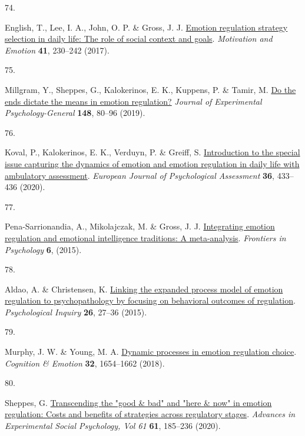\documentclass[
  man,floatsintext]{apa6}
\newlength{\cslhangindent}
\newlength{\csllabelwidth}
\newlength{\cslentryspacingunit} %
\newenvironment{CSLReferences}[2] %
 {%
  \setlength{\parindent}{0pt}
  \ifodd #1
  \let\oldpar\par
  \def\par{\hangindent=\cslhangindent\oldpar}
  \fi
  \setlength{\parskip}{#2\cslentryspacingunit}
 }%
 {}
\newcommand{\CSLLeftMargin}[1]{\parbox[t]{\csllabelwidth}{#1}}
\newcommand{\CSLRightInline}[1]{\parbox[t]{\linewidth - \csllabelwidth}{#1}\break}
\begin{document}
\begin{CSLReferences}{0}{0}
\leavevmode{}%
\CSLLeftMargin{74. }%
\CSLRightInline{English, T., Lee, I. A., John, O. P. \& Gross, J. J. \href{https://doi.org/10.1007/s11031-016-9597-z}{Emotion regulation strategy selection in daily life: The role of social context and goals}. \emph{Motivation and Emotion} \textbf{41}, 230--242 (2017).}

\leavevmode{}%
\CSLLeftMargin{75. }%
\CSLRightInline{Millgram, Y., Sheppes, G., Kalokerinos, E. K., Kuppens, P. \& Tamir, M. \href{https://doi.org/10.1037/xge0000477}{Do the ends dictate the means in emotion regulation?} \emph{Journal of Experimental Psychology-General} \textbf{148}, 80--96 (2019).}

\leavevmode{}%
\CSLLeftMargin{76. }%
\CSLRightInline{Koval, P., Kalokerinos, E. K., Verduyn, P. \& Greiff, S. \href{https://doi.org/10.1027/1015-5759/a000599}{Introduction to the special issue capturing the dynamics of emotion and emotion regulation in daily life with ambulatory assessment}. \emph{European Journal of Psychological Assessment} \textbf{36}, 433--436 (2020).}

\leavevmode{}%
\CSLLeftMargin{77. }%
\CSLRightInline{Pena-Sarrionandia, A., Mikolajczak, M. \& Gross, J. J. \href{https://doi.org/ARTN\%20160\%0A10.3389/fpsyg.2015.00160}{Integrating emotion regulation and emotional intelligence traditions: A meta-analysis}. \emph{Frontiers in Psychology} \textbf{6}, (2015).}

\leavevmode{}%
\CSLLeftMargin{78. }%
\CSLRightInline{Aldao, A. \& Christensen, K. \href{https://doi.org/10.1080/1047840x.2015.962399}{Linking the expanded process model of emotion regulation to psychopathology by focusing on behavioral outcomes of regulation}. \emph{Psychological Inquiry} \textbf{26}, 27--36 (2015).}

\leavevmode{}%
\CSLLeftMargin{79. }%
\CSLRightInline{Murphy, J. W. \& Young, M. A. \href{https://doi.org/10.1080/02699931.2017.1419935}{Dynamic processes in emotion regulation choice}. \emph{Cognition \& Emotion} \textbf{32}, 1654--1662 (2018).}

\leavevmode{}%
\CSLLeftMargin{80. }%
\CSLRightInline{Sheppes, G. \href{https://doi.org/10.1016/bs.aesp.2019.09.003}{Transcending the "good \& bad" and "here \& now" in emotion regulation: Costs and benefits of strategies across regulatory stages}. \emph{Advances in Experimental Social Psychology, Vol 61} \textbf{61}, 185--236 (2020).}


\end{CSLReferences}
\end{document}
